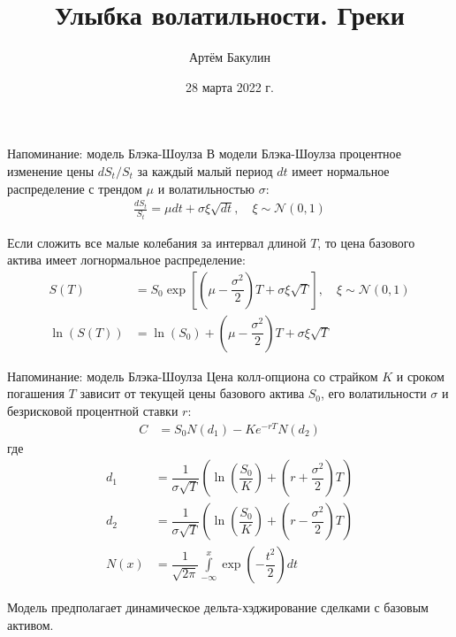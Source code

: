 \documentclass{beamer}
\title{Улыбка волатильности. Греки}
\author{Артём Бакулин}
\date{28 марта 2022 г.}
\begin{document}
\begin{frame}
\titlepage
\end{frame}



\begin{frame}{Напоминание: модель Блэка-Шоулза}
\justify
В модели Блэка-Шоулза процентное изменение цены $dS_t/S_t$ за каждый малый период $dt$ имеет нормальное распределение с трендом $\mu$ и волатильностью $\sigma$:
\begin{align*}
\frac{dS_t}{S_t} = \mu dt + \sigma\xi\sqrt{dt}, \quad \xi \sim \mathcal{N}(0, 1)
\end{align*}

\justify
Если сложить все малые колебания за интервал длиной $T$, то цена базового актива имеет логнормальное распределение:
\begin{align*}
S(T) &= S_0 \exp\left[\left(\mu - \dfrac{\sigma^2}{2}\right)T + \sigma\xi\sqrt{T}\right], \quad \xi \sim \mathcal{N}(0, 1) \\
\ln\left(S(T)\right) &= \ln\left(S_0\right) + \left(\mu - \dfrac{\sigma^2}{2}\right)T + \sigma\xi\sqrt{T}
\end{align*}
\end{frame}



\begin{frame}{Напоминание: модель Блэка-Шоулза}
\justify
Цена колл-опциона со страйком $K$ и сроком погашения $T$ зависит от текущей цены базового актива $S_0$, его волатильности $\sigma$ и безрисковой процентной ставки $r$:
\begin{align*}
C &= S_0N(d_1) - Ke^{-rT}N(d_2)
\end{align*}
где
\begin{align*}
d_1 &= \dfrac{1}{\sigma\sqrt{T}}\left( \ln\left(\dfrac{S_0}{K}\right) + \left(r + \dfrac{\sigma^2}{2}\right)T\right) \\
d_2 &= \dfrac{1}{\sigma\sqrt{T}}\left( \ln\left(\dfrac{S_0}{K}\right) + \left(r - \dfrac{\sigma^2}{2}\right)T\right) \\
N(x) &= \dfrac{1}{\sqrt{2\pi}}\int\limits_{-\infty}^x \exp\left(-\dfrac{t^2}{2}\right)dt
\end{align*}

\justify
Модель предполагает динамическое дельта-хэджирование сделками с базовым активом.
\end{frame}
\end{document}
